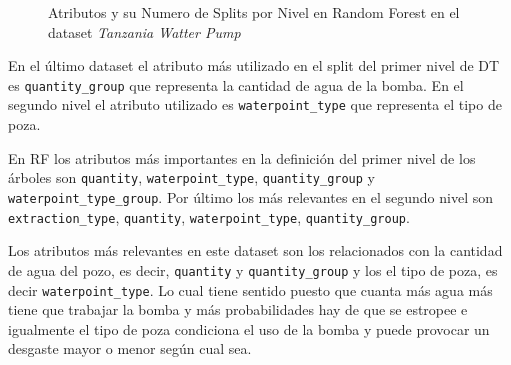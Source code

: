 \documentclass[..]{subfiles}
\begin{document}
\begin{figure}[h!]
\centering
{}
\caption{Atributos y su Numero de Splits por Nivel en Random Forest en el dataset \textit{Tanzania Watter Pump}}%
\end{figure}

En el último dataset el atributo más utilizado en el split del primer nivel de DT es \texttt{quantity\_group} que representa la cantidad de agua de la bomba. En el segundo nivel el atributo utilizado es \texttt{waterpoint\_type} que representa el tipo de poza.

En RF los atributos más importantes en la definición del primer nivel de los árboles son \texttt{quantity}, \texttt{waterpoint\_type}, \texttt{quantity\_group} y \texttt{waterpoint\_type\_group}. Por último los más relevantes en el segundo nivel son \texttt{extraction\_type}, \texttt{quantity}, \texttt{waterpoint\_type}, \texttt{quantity\_group}.

Los atributos más relevantes en este dataset son los relacionados con la cantidad de agua del pozo, es decir, \texttt{quantity} y \texttt{quantity\_group} y los el tipo de poza, es decir \texttt{waterpoint\_type}. Lo cual tiene sentido puesto que cuanta más agua más tiene que trabajar la bomba y más probabilidades hay de que se estropee e igualmente el tipo de poza condiciona el uso de la bomba y puede provocar un desgaste mayor o menor según cual sea.
\end{document}
